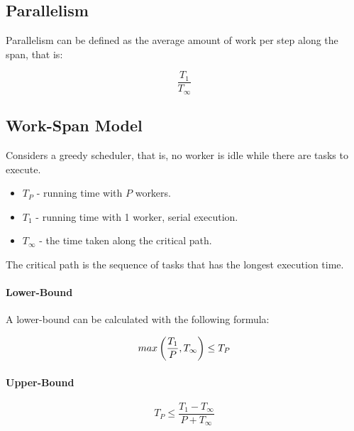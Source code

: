 \subsection{Parallelism}

Parallelism can be defined as the average amount of work per step along the span, that is:

\begin{equation}
    \frac{T_1}{T_\infty}
\end{equation}

\subsection{Work-Span Model}

Considers a greedy scheduler, that is,
no worker is idle while there are tasks to execute.

\begin{itemize}
    \item $T_P$ - running time with $P$ workers.
    \item $T_1$ - running time with 1 worker, serial execution.
    \item $T_\infty$ - the time taken along the critical path.
\end{itemize}

The critical path is the sequence of tasks that has the longest execution time.

\paragraph{Lower-Bound}
A lower-bound can be calculated with the following formula:

\begin{equation}
    \mathnormal{max}\left(\frac{T_1}{P}, T_\infty\right) \le T_P
\end{equation}

\paragraph{Upper-Bound}

\begin{equation}
    T_P \le \frac{T_1 - T_\infty}{P + T_\infty}
\end{equation}